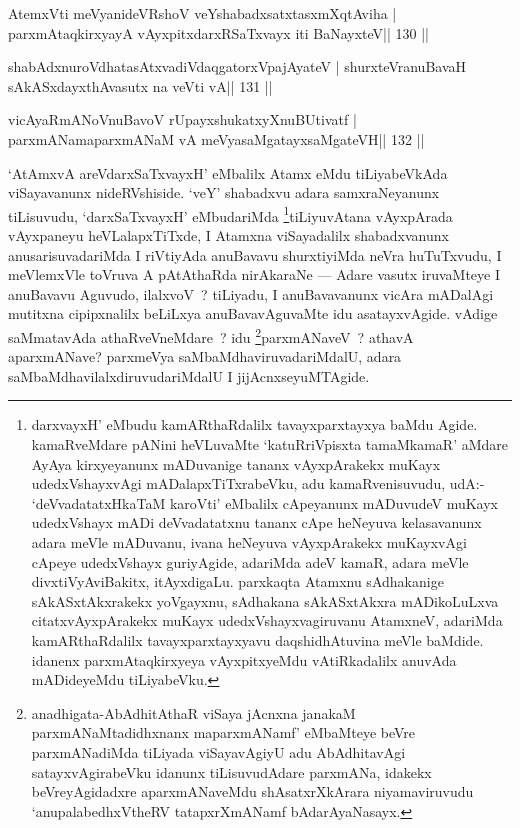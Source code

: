 \begin{shl}
AtemxVti meVyanideVRshoV veYshabadxsatxtasxmXqtAviha |
parxmAtaqkirxyayA vAyxpitxdarxRSaTxvayx iti BaNayxteV\hfill || 130 ||
\end{shl}

\begin{shl}
shabAdxnuroVdhatasAtxvadiVdaqgatorxVpajAyateV |
shurxteVranuBavaH sAkASxdayxthAvasutx na veVti vA\hfill || 131 ||
\end{shl}

\begin{shl}
vicAyaRmANoV\s nuBavoV rUpayxshukatxyXnuBUtivatf |
parxmANamaparxmANaM vA meVyasaMgatayxsaMgateVH\hfill || 132 ||
\end{shl}

\begin{artha}
`AtAmxvA areVdarxSaTxvayxH' eMbalilx Atamx eMdu tiLiyabeVkAda viSayavanunx nideRVshiside. `veY' shabadxvu adara samxraNeyanunx tiLisuvudu, `darxSaTxvayxH' eMbudariMda \footnote{darxvayxH' eMbudu kamARthaRdalilx tavayxparxtayxya baMdu Agide. kamaRveMdare pANini heVLuvaMte `katuRriVpisxta tamaMkamaR' aMdare AyAya kirxyeyanunx mADuvanige tananx vAyxpArakekx muKayx udedxVshayxvAgi mADalapxTiTxrabeVku, adu kamaRvenisuvudu, udA:- `deVvadatatxHkaTaM karoVti' eMbalilx cApeyanunx mADuvudeV muKayx udedxVshayx mADi deVvadatatxnu tananx cApe heNeyuva kelasavanunx adara meVle mADuvanu, ivana heNeyuva vAyxpArakekx muKayxvAgi cApeye udedxVshayx guriyAgide, adariMda adeV kamaR, adara meVle divxtiVyAviBakitx, itAyxdigaLu. parxkaqta Atamxnu sAdhakanige sAkASxtAkxrakekx yoVgayxnu, sAdhakana sAkASxtAkxra mADikoLuLxva citatxvAyxpArakekx muKayx udedxVshayxvagiruvanu AtamxneV, adariMda kamARthaRdalilx tavayxparxtayxyavu daqshidhAtuvina meVle baMdide. idanenx parxmAtaqkirxyeya vAyxpitxyeMdu vAtiRkadalilx anuvAda mADideyeMdu tiLiyabeVku.}tiLiyuvAtana vAyxpArada vAyxpaneyu heVLalapxTiTxde, I Atamxna viSayadalilx shabadxvanunx anusarisuvadariMda I riVtiyAda anuBavavu shurxtiyiMda neVra huTuTxvudu, I meVlemxVle toVruva A pAtAthaRda nirAkaraNe  {\rm ---}  Adare vasutx iruvaMteye I anuBavavu Aguvudo, ilalxvoV~? tiLiyadu, I anuBavavanunx vicAra mADalAgi mutitxna cipipxnalilx beLiLxya anuBavavAguvaMte idu asatayxvAgide. vAdige saMmatavAda athaRveVneMdare~? idu \footnote{anadhigata-AbAdhitAthaR viSaya jAcnxna janakaM parxmANaMtadidhxnanx maparxmANamf' eMbaMteye beVre parxmANadiMda tiLiyada viSayavAgiyU adu AbAdhitavAgi satayxvAgirabeVku idanunx tiLisuvudAdare parxmANa, idakekx beVreyAgidadxre aparxmANaveMdu shAsatxrXkArara niyamaviruvudu `anupalabedhxV\s theRV tatapxrXmANamf bAdarAyaNasayx.}parxmANaveV~? athavA aparxmANave?  parxmeVya saMbaMdhaviruvadariMdalU, adara saMbaMdhavilalxdiruvudariMdalU I jijAcnxseyuMTAgide.
\end{artha}

